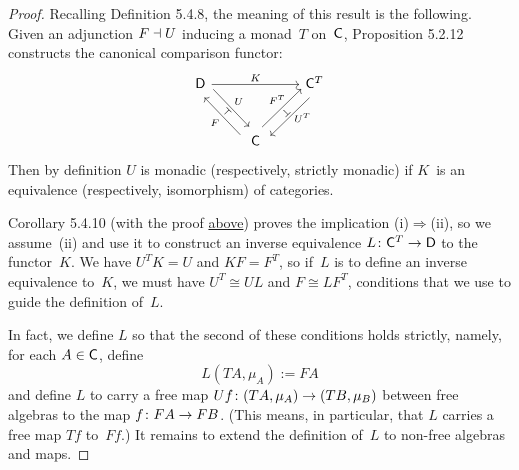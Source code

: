 \documentclass[../../solutions]{subfiles}
\begin{document}
\begin{proof}[Proof]
  \renewcommand*{\theequation}{%
    \thesection.\arabic{equation}%
  }
  Recalling Definition 5.4.8, the meaning of this result is the
  following.  Given an adjunction $F\dashv U$ inducing a monad~$T$
  on~${\mathsf{C}}$, Proposition 5.2.12 constructs the canonical comparison
  functor:
  $$
  \begin{tikzcd}[row sep=large, column sep=normal]
    \sD \ar[rr, "K"]
    \ar[dr, shift left=1ex, pos=0.5, "U"]
    \ar[dr, phantom, "\scriptstyle\top" {anchor=center, rotate=-45,
      inner sep=.5mm}]
    \ar[dr, shift right=1ex, leftarrow, pos=0.5, "F"']
    && \sC^T
    \ar[dl, shift left=1ex, pos=0.4, "U^T" {inner sep=0mm}]
    \ar[dl, phantom, "\scriptstyle\bot" {anchor=center, rotate=45,
      inner sep=.5mm}]
    \ar[dl, shift right=1ex, leftarrow, pos=0.4, "F^T"' {inner sep=0mm}]
    \\
    & \sC
  \end{tikzcd}
  $$
  Then by definition $U$ is monadic (respectively, strictly monadic)
  if $K$~is an equivalence (respectively, isomorphism) of categories.

  Corollary 5.4.10 (with the proof \hyperref[def:5.4.8]{above}) proves
  the implication (i)$\Rightarrow$(ii), so we assume~(ii) and use it
  to construct an inverse equivalence ${L}\colon{{\mathsf{C}}^T}\to{{\mathsf{D}}}$ to the
  functor~$K$.  We have $U^TK=U$ and $KF=F^T$, so if~$L$ is to define
  an inverse equivalence to~$K$, we must have $U^T\cong UL$ and
  $F\cong LF^T$, conditions that we use to guide the definition
  of~$L$.
  
  In fact, we define $L$ so that the second of these conditions holds
  strictly, namely, for each $A\in{\mathsf{C}}$, define
  $$L(TA,\mu_A) := FA$$
  and define $L$ to carry a free map
  ${Uf}\colon{(TA,\mu_A)}\to{(TB,\mu_B)}$ between free algebras to the map
  ${f}\colon{FA}\to{FB}$.  (This means, in particular, that $L$ carries a
  free map $Tf$ to~$Ff$.)  It remains to extend the definition of~$L$
  to non-free algebras and maps.


\end{proof}
\end{document}
